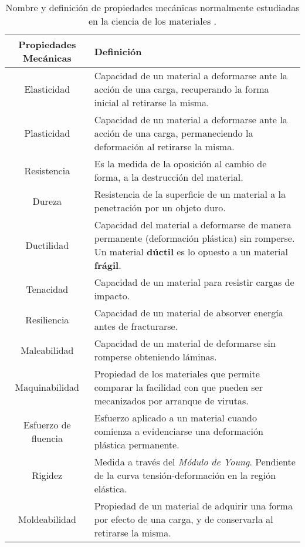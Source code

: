 \begin{table}[htp]
\caption[Nombre y definición de propiedades mecánicas.]{Nombre y definición de propiedades mecánicas normalmente estudiadas en la ciencia de los materiales
\citep{askeland98}.}
\begin{center}
\begin{tabular}{c C{10cm}}
\hline
\textbf{Propiedades Mecánicas} & \textbf{Definición} \\ \hline
 \hline

Elasticidad &
Capacidad de un material a deformarse ante la acción de una carga, recuperando la forma inicial al retirarse la misma. \\ \hline
 
Plasticidad &
Capacidad de un material a deformarse ante la acción de una carga, permaneciendo la deformación al retirarse la misma. \\ \hline 
 
Resistencia & 
Es la medida de la oposición al cambio de forma, a la destrucción del material. \\ \hline

Dureza & 
Resistencia de la superficie de un material a la penetración por un objeto duro.\\ \hline

Ductilidad & 
Capacidad del material a deformarse de manera permanente (deformación plástica) sin romperse. Un material \textbf{dúctil} es lo opuesto a un material \textbf{frágil}. \\ \hline

Tenacidad & 
Capacidad de un material para resistir cargas de impacto. \\ \hline

Resiliencia &
Capacidad de un material de absorver energía antes de fracturarse. \\ \hline

Maleabilidad & 
Capacidad de un material de deformarse sin romperse obteniendo láminas. \\ \hline

Maquinabilidad &
Propiedad de los materiales que permite comparar la facilidad con que pueden ser mecanizados por arranque de virutas. \\ \hline

Esfuerzo de fluencia & 
Esfuerzo aplicado a un material cuando comienza a evidenciarse una deformación plástica permanente.\\ \hline

Rigidez & 
Medida a través del \textit{Módulo de Young}. Pendiente de la curva tensión-deformación en la región elástica. \\ \hline

Moldeabilidad &
Propiedad de un material de adquirir una forma por efecto de una carga, y de conservarla al retirarse la misma. \\ \hline

\end{tabular}
\end{center}
\label{C1:tbl:propiedades}
\end{table}


